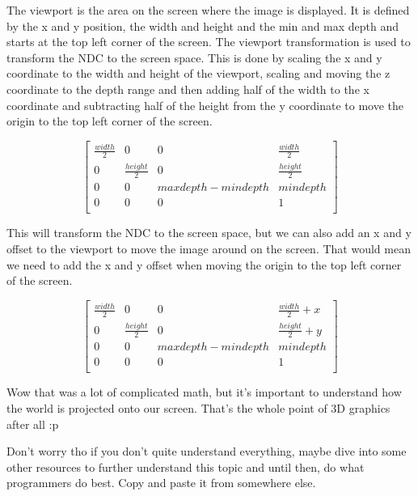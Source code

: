 \documentclass[12pt]{report} \usepackage{preamble}
\begin{document}
The viewport is the area on the screen where the image is displayed.
It is defined by the x and y position, the width and height and the
min and max depth and starts at the top left corner of the screen.
The viewport transformation is used to transform the \ac{NDC} to the screen space.
This is done by scaling the x and y coordinate to the width and height of the viewport,
scaling and moving the z coordinate to the depth range and then adding
half of the width to the x coordinate and subtracting half of the height from the y coordinate
to move the origin to the top left corner of the screen.

\[
	\begin{bmatrix}
		\frac{width}{2} & 0                & 0                   & \frac{width}{2}  \\
		0               & \frac{height}{2} & 0                   & \frac{height}{2} \\
		0               & 0                & maxdepth - mindepth & mindepth         \\
		0               & 0                & 0                   & 1                \\
	\end{bmatrix}
\]

This will transform the \ac{NDC} to the screen space, but we can also add an x
and y offset to the viewport to move the image around on the screen.
That would mean we need to add the x and y offset when moving
the origin to the top left corner of the screen.

\[
	\begin{bmatrix}
		\frac{width}{2} & 0                & 0                   & \frac{width}{2} + x  \\
		0               & \frac{height}{2} & 0                   & \frac{height}{2} + y \\
		0               & 0                & maxdepth - mindepth & mindepth             \\
		0               & 0                & 0                   & 1                    \\
	\end{bmatrix}
\]

Wow that was a lot of complicated math, but it's important to understand how the world is
projected onto our screen. That's the whole point of 3D graphics after all :p

Don't worry tho if you don't quite understand everything, maybe dive into some other resources to further
understand this topic and until then, do what programmers do best. Copy and paste it from somewhere else.
\end{document}
